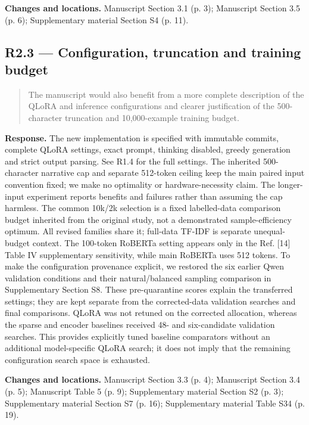 \documentclass[11pt,a4paper]{article}
\begin{document}
\textbf{Changes and locations.} Manuscript Section 3.1 (p. 3); Manuscript Section 3.5 (p. 6); Supplementary material Section S4 (p. 11).

\subsection*{R2.3 — Configuration, truncation and training budget}
\begin{quote}\small The manuscript would also benefit from a more complete description of the QLoRA and inference configurations and clearer justification of the 500-character truncation and 10,000-example training budget.\end{quote}
\textbf{Response.} The new implementation is specified with immutable commits, complete QLoRA settings, exact prompt, thinking disabled, greedy generation and strict output parsing. See R1.4 for the full settings. The inherited 500-character narrative cap and separate 512-token ceiling keep the main paired input convention fixed; we make no optimality or hardware-necessity claim. The longer-input experiment reports benefits and failures rather than assuming the cap harmless. The common 10k/2k selection is a fixed labelled-data comparison budget inherited from the original study, not a demonstrated sample-efficiency optimum. All revised families share it; full-data TF-IDF is separate unequal-budget context. The 100-token RoBERTa setting appears only in the Ref. [14] Table IV supplementary sensitivity, while main RoBERTa uses 512 tokens. To make the configuration provenance explicit, we restored the six earlier Qwen validation conditions and their natural/balanced sampling comparison in Supplementary Section S8. These pre-quarantine scores explain the transferred settings; they are kept separate from the corrected-data validation searches and final comparisons. QLoRA was not retuned on the corrected allocation, whereas the sparse and encoder baselines received 48- and six-candidate validation searches. This provides explicitly tuned baseline comparators without an additional model-specific QLoRA search; it does not imply that the remaining configuration search space is exhausted.

\textbf{Changes and locations.} Manuscript Section 3.3 (p. 4); Manuscript Section 3.4 (p. 5); Manuscript Table 5 (p. 9); Supplementary material Section S2 (p. 3); Supplementary material Section S7 (p. 16); Supplementary material Table S34 (p. 19).
\end{document}
